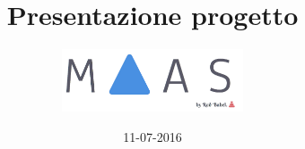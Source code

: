 \documentclass[]{beamer}
\title{Presentazione progetto}
\author[BugBusters]{\includegraphics[width=0.4\textwidth]{logo.png}}
\date{11-07-2016}
\institute{Progetto MaaS}
\begin{document}
\graphicspath{ {res/img/} }



\end{document}
